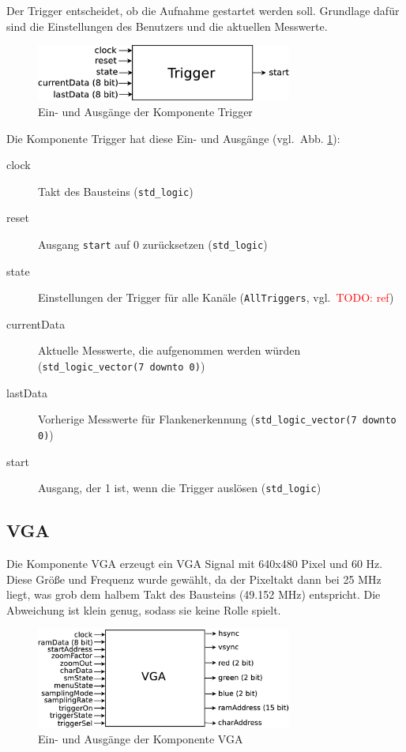 \documentclass[IN,ngerman,utf8,12pt]{tumbook}
\newcommand\todo[1]{\textcolor{red}{TODO: #1}}
\newcommand{\vgl}{vgl.\ }
\begin{document}
Der Trigger entscheidet, ob die Aufnahme gestartet werden soll.
Grundlage dafür sind die Einstellungen des Benutzers und die aktuellen Messwerte.

\begin{figure}[H]
    \centerline{
        \includegraphics[width=0.75\textwidth]{img/trigger}
    }
    \label{abb:trigger}
    \caption{Ein- und Ausgänge der Komponente Trigger}
\end{figure}

Die Komponente Trigger hat diese Ein- und Ausgänge (\vgl Abb. \ref{abb:trigger}):

\begin{description}
    \item[clock] Takt des Bausteins (\texttt{std\_logic})
    \item[reset] Ausgang \texttt{start} auf 0 zurücksetzen (\texttt{std\_logic})
    \item[state] Einstellungen der Trigger für alle Kanäle (\texttt{AllTriggers}, \vgl \todo{ref})
    \item[currentData] Aktuelle Messwerte, die aufgenommen werden würden (\texttt{std\_logic\_vector(7 downto 0)})
    \item[lastData] Vorherige Messwerte für Flankenerkennung (\texttt{std\_logic\_vector(7 downto 0)})
    \item[start] Ausgang, der 1 ist, wenn die Trigger auslösen (\texttt{std\_logic})
\end{description}

\subsection{VGA}

Die Komponente VGA erzeugt ein VGA Signal mit 640x480 Pixel und 60 Hz.
Diese Größe und Frequenz wurde gewählt, da der Pixeltakt dann bei 25 MHz liegt, was grob dem halbem Takt des Bausteins (49.152 MHz) entspricht.
Die Abweichung ist klein genug, sodass sie keine Rolle spielt.

\begin{figure}[H]
    \centerline{
        \includegraphics[width=0.75\textwidth]{img/vga}
    }
    \label{abb:vga}
    \caption{Ein- und Ausgänge der Komponente VGA}
\end{figure}
\end{document}
